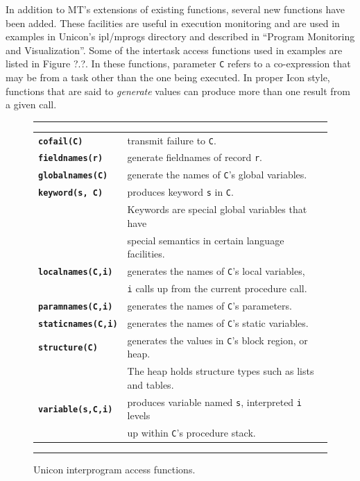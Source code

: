 
In addition to MT's extensions of existing functions, several new
functions have been added.  These facilities are useful in execution
monitoring and are used in examples in Unicon's ipl/mprogs directory
and described in ``Program Monitoring and
Visualization''. Some of
the intertask access functions used in examples are listed in Figure
?.?.  In these functions, parameter {\tt C} refers to a co-expression
that may be from a task other than the one being executed.  In proper
Icon style, functions that are said to {\em generate} values can produce
more than one result from a given call.

\begin{figure}[t]
\hrule\bigskip
\centering

\begin{tabular}{|ll|} \hline
{\bf\tt cofail(C)}      & transmit failure to {\tt C}. \\
{\bf\tt fieldnames(r)}  & generate fieldnames of record {\tt r}. \\
{\bf\tt globalnames(C)} & generate the names of {\tt C}'s global
variables. \\
{\bf\tt keyword(s, C)} & produces keyword {\tt s} in {\tt C}. \\
	& Keywords are special global variables that have \\
	& special semantics in certain language facilities.\\
{\bf\tt localnames(C,i)} & generates the names of {\tt C}'s local variables,\\
	& {\tt i} calls up from the current procedure call. \\
{\bf\tt paramnames(C,i)} & generates the names of {\tt C}'s parameters. \\
{\bf\tt staticnames(C,i)} & generates the names of {\tt C}'s static variables. \\
{\bf\tt structure(C)} & generates the values in {\tt C}'s block
region, or heap. \\
	 & The heap holds structure types such as lists and tables. \\
{\bf\tt variable(s,C,i)} & produces variable named {\tt s}, interpreted {\tt i} levels\\
	& up within {\tt C}'s procedure stack. \\
\hline
\end{tabular}

\caption{Unicon interprogram access functions.}
\medskip\hrule
\end{figure}





